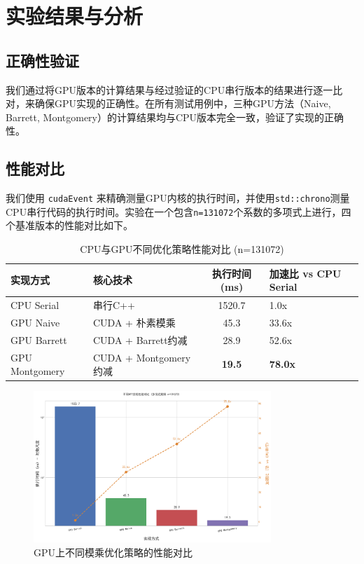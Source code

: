 \documentclass[a4paper]{article}
\begin{document}
\section{实验结果与分析}
\subsection{正确性验证}
我们通过将GPU版本的计算结果与经过验证的CPU串行版本的结果进行逐一比对，来确保GPU实现的正确性。在所有测试用例中，三种GPU方法（Naive, Barrett, Montgomery）的计算结果均与CPU版本完全一致，验证了实现的正确性。

\subsection{性能对比}
我们使用 \texttt{cudaEvent} 来精确测量GPU内核的执行时间，并使用\texttt{std::chrono}测量CPU串行代码的执行时间。实验在一个包含\texttt{n=131072}个系数的多项式上进行，四个基准版本的性能对比如下。

\begin{table}[H]
    \centering
    \caption{CPU与GPU不同优化策略性能对比 (n=131072)}
    \label{tab:gpu_perf_summary}
    \begin{tabular}{llc|l}
    \toprule
    \textbf{实现方式} & \textbf{核心技术} & \textbf{执行时间 (ms)} & \textbf{加速比 vs CPU Serial} \\
    \midrule
    CPU Serial     & 串行C++ & 1520.7        & 1.0x                 \\
    GPU Naive      & CUDA + 朴素模乘 & 45.3          & 33.6x                \\
    GPU Barrett    & CUDA + Barrett约减 & 28.9          & 52.6x                \\
    GPU Montgomery & CUDA + Montgomery约减 & \textbf{19.5}      & \textbf{78.0x}            \\
    \bottomrule
    \end{tabular}
\end{table}

\begin{figure}[H]
    \centering
    \includegraphics[width=0.8\textwidth]{fig/performance.png}
    \caption{GPU上不同模乘优化策略的性能对比}
    \label{fig:gpu_perf}
\end{figure}
\end{document}
